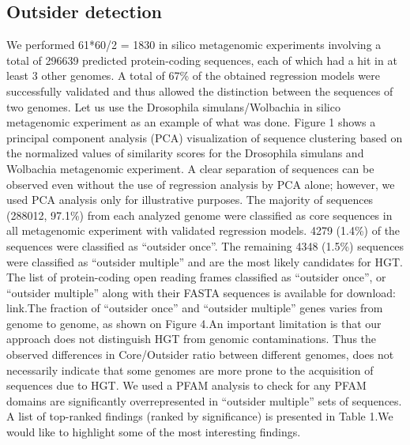 \subsection{Outsider detection}
We performed 61*60/2 = 1830 in silico metagenomic experiments involving a total
of 296639 predicted protein-coding sequences, each of which had a hit in at
least 3 other genomes. A total of 67\% of the obtained regression models were
successfully validated and thus allowed the distinction between the sequences
of two genomes. Let us use the Drosophila simulans/Wolbachia in silico
metagenomic experiment as an example of what was done. Figure 1 shows a
principal component analysis (PCA) visualization of sequence clustering based
on the normalized values of similarity scores for the Drosophila simulans and
Wolbachia metagenomic experiment. A clear separation of sequences can be
observed even without the use of regression analysis by PCA alone; however, we
used PCA analysis only for illustrative purposes. The majority of sequences
(288012, 97.1\%) from each analyzed genome were classified as core sequences in
all metagenomic experiment with validated regression models. 4279 (1.4\%) of
the sequences were classified as “outsider once”. The remaining 4348 (1.5\%)
sequences were classified as “outsider multiple” and are the most likely
candidates for HGT. The list of protein-coding open reading frames classified
as “outsider once”, or “outsider multiple” along with their FASTA sequences is
available for download: link.The fraction of “outsider once” and “outsider
multiple” genes varies from genome to genome, as shown on Figure 4.An important
limitation is that our approach does not distinguish HGT from genomic
contaminations. Thus the observed differences in Core/Outsider ratio between
different genomes, does not necessarily indicate that some genomes are more
prone to the acquisition of sequences due to HGT. We used a PFAM analysis to
check for any PFAM domains are significantly overrepresented in “outsider
multiple” sets of sequences. A list of top-ranked findings (ranked by
significance) is presented in Table 1.We would like to highlight some of the
most interesting findings.
